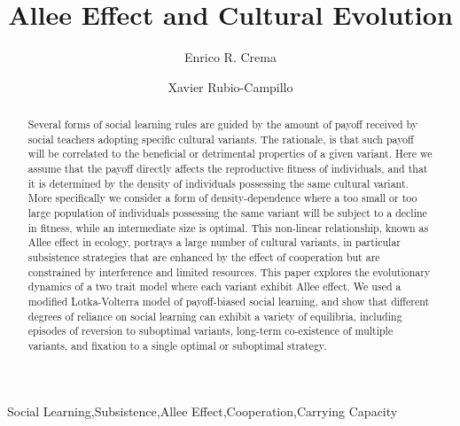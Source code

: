 \documentclass[preprint,authoryear]{elsarticle}
\begin{document}
\begin{frontmatter}

\title{Allee Effect and Cultural Evolution}


\author[label1,label2]{Enrico R. Crema}
\author[label3]{Xavier Rubio-Campillo}

\address[label1]{CaSEs - Complexity and Socio-Ecological Dynamics Research Group, Barcelona}
\address[label2]{UCL Institute of Archaeology}
\address[label3]{BSC - Barcelona Supercomputing Center}



\begin{abstract}
Several forms of social learning rules are guided by the amount of payoff received by social teachers adopting specific cultural variants. The rationale, is that such payoff will be correlated to the beneficial or detrimental properties of a given variant. Here we assume that the payoff directly affects the reproductive fitness of individuals, and that it is determined by the density of individuals possessing the same cultural variant. More specifically we consider a  form of density-dependence where a too small or too large population of individuals possessing the same variant will be subject to a decline in fitness, while an intermediate size is optimal. This non-linear relationship, known as Allee effect in ecology, portrays a large number of cultural variants, in particular subsistence strategies that are enhanced  by the effect of cooperation but are constrained by interference and limited resources. This paper explores the evolutionary dynamics of a two trait model where each variant exhibit Allee effect. We used a modified Lotka-Volterra model of payoff-biased social learning, and show that different degrees of reliance on social learning can exhibit a variety of equilibria, including episodes of reversion to suboptimal variants, long-term co-existence of multiple variants, and fixation to a single optimal or suboptimal strategy.

\end{abstract}

\begin{keyword}
Social Learning\sep Subsistence\sep Allee Effect\sep Cooperation\sep Carrying Capacity
\end{keyword}

\end{frontmatter}
\end{document}
